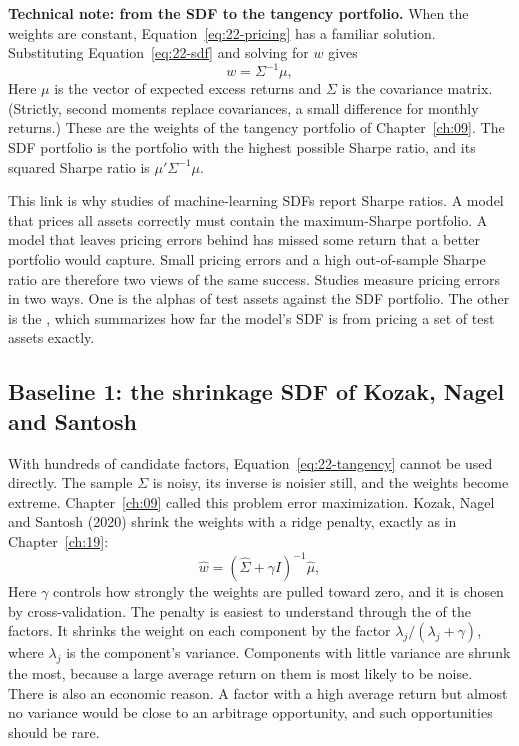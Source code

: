 \begin{technote}
\textbf{Technical note: from the SDF to the tangency portfolio.} When the weights are constant, Equation~\eqref{eq:22-pricing} has a familiar solution. Substituting Equation~\eqref{eq:22-sdf} and solving for $w$ gives
\begin{equation}
  w = \Sigma^{-1} \mu,
  \label{eq:22-tangency}
\end{equation}
Here $\mu$ is the vector of expected excess returns and $\Sigma$ is the covariance matrix. (Strictly, second moments replace covariances, a small difference for monthly returns.) These are the weights of the tangency portfolio of Chapter~\ref{ch:09}. The SDF portfolio is the portfolio with the highest possible Sharpe ratio, and its squared Sharpe ratio is $\mu'\Sigma^{-1}\mu$.
\end{technote}

This link is why studies of machine-learning SDFs report Sharpe ratios. A model that prices all assets correctly must contain the maximum-Sharpe portfolio. A model that leaves pricing errors behind has missed some return that a better portfolio would capture. Small pricing errors and a high out-of-sample Sharpe ratio are therefore two views of the same success. Studies measure pricing errors in two ways. One is the alphas of test assets against the SDF portfolio. The other is the , which summarizes how far the model's SDF is from pricing a set of test assets exactly.

\subsection{Baseline 1: the shrinkage SDF of Kozak, Nagel and Santosh}

With hundreds of candidate factors, Equation~\eqref{eq:22-tangency} cannot be used directly. The sample $\Sigma$ is noisy, its inverse is noisier still, and the weights become extreme. Chapter~\ref{ch:09} called this problem error maximization. Kozak, Nagel and Santosh (2020) shrink the weights with a ridge penalty, exactly as in Chapter~\ref{ch:19}:
\begin{equation}
  \hat w = \left(\hat\Sigma + \gamma I\right)^{-1} \hat\mu,
  \label{eq:22-kns}
\end{equation}
Here $\gamma$ controls how strongly the weights are pulled toward zero, and it is chosen by cross-validation. The penalty is easiest to understand through the  of the factors. It shrinks the weight on each component by the factor $\lambda_j/(\lambda_j+\gamma)$, where $\lambda_j$ is the component's variance. Components with little variance are shrunk the most, because a large average return on them is most likely to be noise. There is also an economic reason. A factor with a high average return but almost no variance would be close to an arbitrage opportunity, and such opportunities should be rare.

